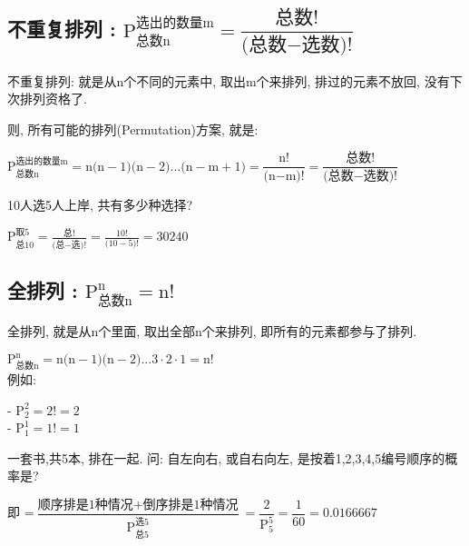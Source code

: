 \documentclass[UTF8]{ctexart}
\begin{document}
	
	
	
	
	
	
	
	
	
	\subsection{不重复排列 : $\text{P}_{\text{总数n}}^{\text{选出的数量m}}=\dfrac{\text{总数!}}{\text{(总数}-\text{选数)!}}		$}
	
	不重复排列: 就是从n个不同的元素中, 取出m个来排列, 排过的元素不放回, 没有下次排列资格了. 
	
	则, 所有可能的排列(Permutation)方案, 就是:	
	
	$
		\boxed{		\text{P}_{\text{总数n}}^{\text{选出的数量m}}=\text{n(n}-1\text{)(n}-2\text{)...(n}-\text{m}+1\text{)}=\dfrac{\text{n!}}{\text{(n}-\text{m)!}}=\dfrac{\text{总数!}}{\text{(总数}-\text{选数)!}} 
		}
	$
	
	\begin{myEnvSample}
		10人选5人上岸, 共有多少种选择?
		
		$
		\text{P}_{\text{总}10}^{\text{取}5}=\frac{\text{总!}}{\text{(总}-\text{选)!}}=\frac{10!}{\text{(}10-5\text{)!}}=30240
		$
	\end{myEnvSample}
	
	
	
	
	
	\subsection{全排列 : $\text{P}_{\text{总数n}}^{\text{n}}=\text{n!}	$ }
	
	全排列, 就是从n个里面, 取出全部n个来排列, 即所有的元素都参与了排列.
	
	$ \boxed{
	\text{P}_{\text{总数n}}^{\text{n}}=\text{n(n}-1\text{)(n}-2\text{)}...3\cdot 2\cdot 1=\text{n!}
	}
	$ \\
	
	例如:
	
	- $	\text{P}_{2}^{2}=2!=2	$ \\	
	- $ \text{P}_{1}^{1}=1!=1$ \\
	
		\begin{myEnvSample}
		一套书,共5本, 排在一起. 问: 自左向右, 或自右向左, 是按着1,2,3,4,5编号顺序的概率是?
		
		即 =$
		\dfrac{\text{顺序排是1种情况}+\text{倒序排是1种情况}}{\text{P}_{\text{总}5}^{\text{选}5}}=\dfrac{2}{\text{P}_{5}^{5}}=\dfrac{1}{60}=0.0166667
		$
	\end{myEnvSample} 
\end{document}
